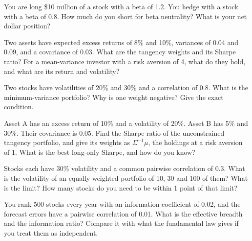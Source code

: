 \begin{question}\label{iq:iv2:portfolio-construction:6}
You are long \$10 million of a stock with a beta of 1.2. You hedge with a stock with a beta of 0.8. How much do you short for beta neutrality? What is your net dollar position?
\end{question}

\begin{question}\label{iq:iv2:portfolio-construction:7}
Two assets have expected excess returns of 8\% and 10\%, variances of 0.04 and 0.09, and a covariance of 0.03. What are the tangency weights and its Sharpe ratio? For a mean-variance investor with a risk aversion of 4, what do they hold, and what are its return and volatility?
\end{question}

\begin{question}\label{iq:iv2:portfolio-construction:8}
Two stocks have volatilities of 20\% and 30\% and a correlation of 0.8. What is the minimum-variance portfolio? Why is one weight negative? Give the exact condition.
\end{question}

\begin{question}\label{iq:iv2:portfolio-construction:9}
Asset A has an excess return of 10\% and a volatility of 20\%. Asset B has 5\% and 30\%. Their covariance is 0.05. Find the Sharpe ratio of the unconstrained tangency portfolio, and give its weights as $\Sigma^{-1}\mu$, the holdings at a risk aversion of 1. What is the best long-only Sharpe, and how do you know?
\end{question}

\begin{question}\label{iq:iv2:portfolio-construction:10}
Stocks each have 30\% volatility and a common pairwise correlation of 0.3. What is the volatility of an equally weighted portfolio of 10, 30 and 100 of them? What is the limit? How many stocks do you need to be within 1 point of that limit?
\end{question}

\begin{question}\label{iq:iv2:portfolio-construction:11}
You rank 500 stocks every year with an information coefficient of 0.02, and the forecast errors have a pairwise correlation of 0.01. What is the effective breadth and the information ratio? Compare it with what the fundamental law gives if you treat them as independent.
\end{question}

